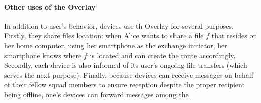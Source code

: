 


\paragraph*{Other uses of the \squad Overlay} In addition to user's behavior, devices use th \squad Overlay for several purposes. Firstly, they share files location: when Alice wants to share a file $f$ that resides on her home computer, using her smartphone as the exchange initiator, her smartphone knows where $f$ is located and can create the route accordingly. 
Secondly, each device is also informed of its user's ongoing file transfers (which serves the next purpose).
Finally, because devices can receive messages on behalf of their fellow squad members to ensure reception despite the proper recipient being offline, 
one's devices can forward messages among the \squad.


